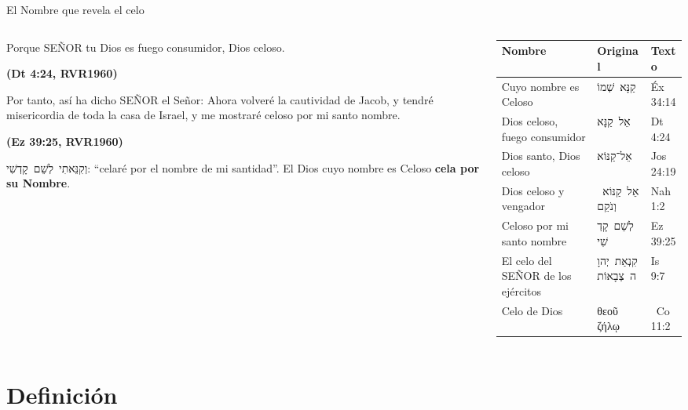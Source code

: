 \documentclass[hyperref={bookmarks=false},aspectratio=169]{beamer}
\newcommand{\heb}[1]{\mbox{\foreignlanguage{hebrew}{#1}}}
\newcommand{\grc}[1]{\foreignlanguage{ancientgreek}{#1}}
\newcommand{\SENOR}{S{\fontsize{0.78em}{1em}\selectfont EÑOR}}
\newcommand{\fuente}[1]{\par\hfill{\upshape\bfseries\footnotesize\textcolor{azul}{#1}}}
\newcommand{\destacar}[1]{\textbf{\textcolor{azul}{#1}}}
\begin{document}
\begin{frame}{El Nombre que revela el celo}
\begin{columns}[c,onlytextwidth]
\begin{column}{0.45\textwidth}
\begin{cita}Porque \SENOR{} tu Dios es fuego consumidor, Dios celoso.\fuente{(Dt 4:24, RVR1960)}\end{cita}
\begin{cita}[fontupper=\scriptsize\itshape]Por tanto, así ha dicho \SENOR{} el Señor: Ahora volveré la cautividad de Jacob, y tendré misericordia de toda la casa de Israel, y me mostraré celoso por mi santo nombre.\fuente{(Ez 39:25, RVR1960)}\end{cita}
\scriptsize\heb{וְקִנֵּאתִי לְשֵׁם קָדְשִׁי}: ``celaré por el nombre de mi santidad''. El Dios cuyo nombre es Celoso \destacar{cela por su Nombre}.
\end{column}
\begin{column}{0.53\textwidth}\scriptsize
\renewcommand{\arraystretch}{1.12}
\begin{tabular}{@{}>{\RaggedRight\arraybackslash}p{2.6cm}>{\RaggedRight\arraybackslash}p{2.2cm}>{\RaggedRight\arraybackslash}p{1.6cm}@{}}
\toprule
\textbf{Nombre} & \textbf{Original} & \textbf{Texto} \\ \midrule
Cuyo nombre es Celoso & \heb{קַנָּא שְׁמוֹ} & Éx 34:14 \\
Dios celoso, fuego consumidor & \heb{אֵל קַנָּא} & Dt 4:24 \\
Dios santo, Dios celoso & \heb{אֵל־קַנּוֹא} & Jos 24:19 \\
Dios celoso y vengador & \heb{אֵל קַנּוֹא וְנֹקֵם} & Nah 1:2 \\
Celoso por mi santo nombre & \heb{לְשֵׁם קָדְשִׁי} & Ez 39:25 \\
El celo del \SENOR{} de los ejércitos & \heb{קִנְאַת יְהוָה צְבָאוֹת} & Is 9:7 \\
Celo de Dios & \grc{θεοῦ ζήλῳ} & 2~Co 11:2 \\
\bottomrule
\end{tabular}
\end{column}
\end{columns}
\end{frame}

\section{Definición}
\end{document}
